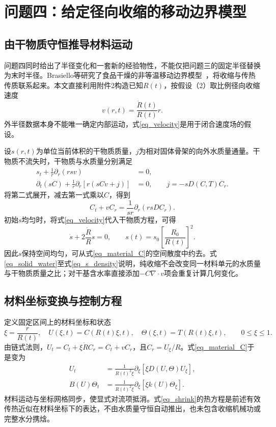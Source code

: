 \section{问题四：给定径向收缩的移动边界模型}
\subsection{由干物质守恒推导材料运动}
问题四同时给出了半径变化和一套新的经验物性，不能仅把问题三的固定半径替换为末时半径。Brasiello等研究了食品干燥的非等温移动边界模型~\cite{brasiello2021}，将收缩与传热传质联系起来。本文直接利用附件2构造已知$R(t)$，按假设（2）取比例径向收缩速度
\begin{equation}\label{eq_velocity}
v(r,t)=\frac{\dot R(t)}{R(t)}r.
\end{equation}
外半径数据本身不能唯一确定内部运动，式\eqref{eq_velocity}是用于闭合速度场的假设。

设$s(r,t)$为单位当前体积的干物质质量，$j$为相对固体骨架的向外水质量通量。干物质不流失时，干物质与水质量分别满足
\begin{equation}\label{eq_solid_water}
\begin{aligned}
s_t+\frac1r\partial_r(rsv)&=0,\\
\partial_t(sC)+\frac1r\partial_r[r(sCv+j)]&=0,\qquad j=-sD(C,T)C_r.
\end{aligned}
\end{equation}
将第二式展开，减去第一式乘以$C$，得到
\begin{equation}\label{eq_material_C}
C_t+vC_r=\frac1{sr}\partial_r(rsDC_r).
\end{equation}
初始$s$均匀时，将式\eqref{eq_velocity}代入干物质方程，可得
\begin{equation}\label{eq_s_density}
\dot s+2\frac{\dot R}{R}s=0,\qquad
s(t)=s_0\left[\frac{R_0}{R(t)}\right]^2.
\end{equation}
因此$s$保持空间均匀，可从式\eqref{eq_material_C}的空间散度中约去。式\eqref{eq_solid_water}至式\eqref{eq_s_density}说明，纯收缩不会改变同一材料单元的水质量与干物质质量之比；对干基含水率直接添加$-C\nabla\cdot v$项会重复计算几何变化。

\subsection{材料坐标变换与控制方程}
定义固定区间上的材料坐标和状态
\begin{equation}\label{eq_xi}
\xi=\frac{r}{R(t)},\quad
U(\xi,t)=C(R(t)\xi,t),\quad
\Theta(\xi,t)=T(R(t)\xi,t),\qquad 0\le\xi\le1.
\end{equation}
由链式法则，$U_t=C_t+\xi\dot R C_r=C_t+vC_r$，且$C_r=U_\xi/R$。式\eqref{eq_material_C}于是变为
\begin{equation}\label{eq_shrink}
\boxed{\begin{aligned}
U_t&=\frac1{R(t)^2\xi}\partial_\xi[\xi D(U,\Theta)U_\xi],\\
B(U)\Theta_t&=\frac1{R(t)^2\xi}\partial_\xi[\xi k(U)\Theta_\xi].
\end{aligned}}
\end{equation}
材料运动与坐标网格同步，使显式对流项抵消。式\eqref{eq_shrink}的热方程是前述有效传热近似在材料坐标下的表达，不由水质量守恒自动推出，也未包含收缩机械功或完整水分携焓。

